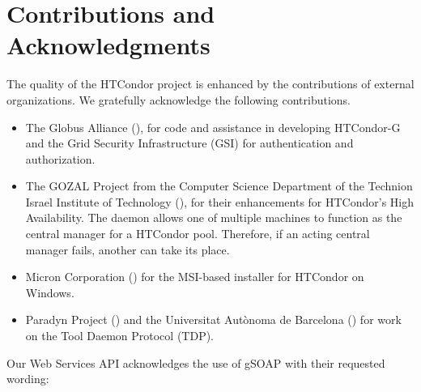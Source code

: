 \section{\label{sec:contributions}Contributions and Acknowledgments}

The quality of the HTCondor project is enhanced by the contributions
of external organizations.
We gratefully acknowledge the following contributions. 

\begin{itemize}

\item{The Globus Alliance} (), 
for code and assistance in developing HTCondor-G
and the Grid Security Infrastructure (GSI)
for authentication and authorization. 

\item{The GOZAL Project}
from the Computer Science Department
of the Technion Israel Institute of Technology
(),
for their enhancements for HTCondor's High Availability.
The  daemon allows one of multiple machines to function
as the central manager for a HTCondor pool.
Therefore, if an acting central manager fails,
another can take its place.


\item{Micron Corporation} ()
for the MSI-based installer for HTCondor on Windows.

\item{Paradyn Project} ()
and the Universitat Aut\`{o}noma de Barcelona
() for work on the Tool Daemon Protocol (TDP).

\end{itemize}

Our Web Services API acknowledges the use of gSOAP with their
requested wording:

